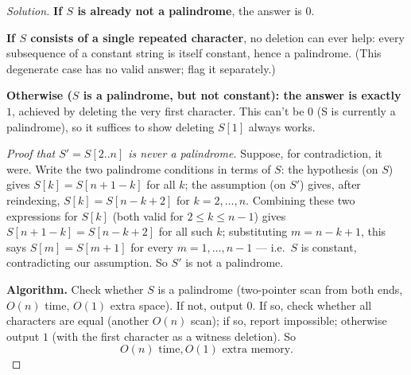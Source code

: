 \documentclass[11pt]{article}
\theoremstyle{definition}
\begin{document}
\begin{proof}[Solution]
\textbf{If $S$ is already not a palindrome}, the answer is $0$.

\textbf{If $S$ consists of a single repeated character}, no deletion can ever help: every subsequence of a constant string is itself constant, hence a palindrome. (This degenerate case has no valid answer; flag it separately.)

\textbf{Otherwise ($S$ is a palindrome, but not constant): the answer is exactly $1$}, achieved by deleting the very first character. This can't be $0$ (S is currently a palindrome), so it suffices to show deleting $S[1]$ always works.

\emph{Proof that $S'=S[2..n]$ is never a palindrome.} Suppose, for contradiction, it were. Write the two palindrome conditions in terms of $S$: the hypothesis (on $S$) gives $S[k]=S[n+1-k]$ for all $k$; the assumption (on $S'$) gives, after reindexing, $S[k]=S[n-k+2]$ for $k=2,\dots,n$. Combining these two expressions for $S[k]$ (both valid for $2\le k\le n-1$) gives $S[n+1-k]=S[n-k+2]$ for all such $k$; substituting $m=n-k+1$, this says $S[m]=S[m+1]$ for every $m=1,\dots,n-1$ — i.e.\ $S$ is constant, contradicting our assumption. So $S'$ is not a palindrome.

\textbf{Algorithm.} Check whether $S$ is a palindrome (two-pointer scan from both ends, $O(n)$ time, $O(1)$ extra space). If not, output $0$. If so, check whether all characters are equal (another $O(n)$ scan); if so, report impossible; otherwise output $1$ (with the first character as a witness deletion). So
\[
\boxed{O(n) \text{ time}, O(1) \text{ extra memory}}.
\]
\end{proof}
\end{document}
